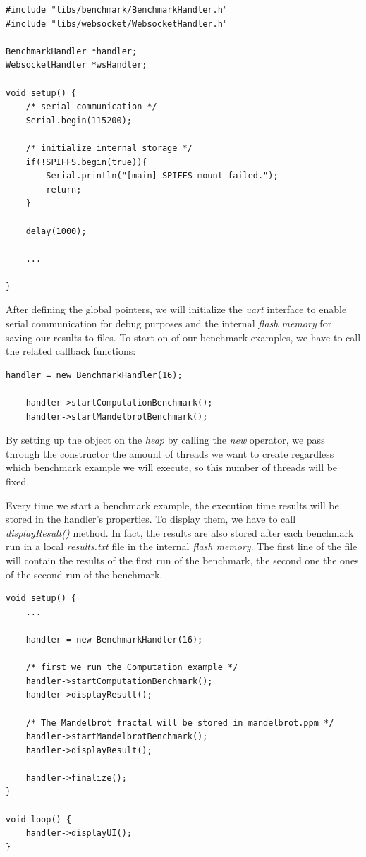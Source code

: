 \begin{lstlisting}[label=list:benchmarkHandler, caption=Necessary include's for the benchmark setup]
#include "libs/benchmark/BenchmarkHandler.h"
#include "libs/websocket/WebsocketHandler.h"

BenchmarkHandler *handler;
WebsocketHandler *wsHandler;

void setup() {
	/* serial communication */
	Serial.begin(115200);
	
	/* initialize internal storage */
	if(!SPIFFS.begin(true)){
		Serial.println("[main] SPIFFS mount failed.");
		return;
	}
	
	delay(1000);
	
	...
	
}
\end{lstlisting}

After defining the global pointers, we will initialize the \textit{uart} interface to enable serial communication for debug purposes and the internal \textit{flash memory} for saving our results to files. To start on of our benchmark examples, we have to call the related callback functions:

\begin{lstlisting}[label=list:benchmarkHandlerStart, caption=Example on how to start the benchmark process]
	handler = new BenchmarkHandler(16);

	handler->startComputationBenchmark();
	handler->startMandelbrotBenchmark();
\end{lstlisting}

\newpage

By setting up the object on the \textit{heap} by calling the \textit{new} operator, we pass through the constructor the amount of threads we want to create regardless which benchmark example we will execute, so this number of threads will be fixed.

Every time we start a benchmark example, the execution time results will be stored in the handler's properties. To display them, we have to call \textit{displayResult()} method. In fact, the results are also stored after each benchmark run in a local \textit{results.txt} file in the internal \textit{flash memory}. The first line of the file will contain the results of the first run of the benchmark, the second one the ones of the second run of the benchmark.

\begin{lstlisting}[label=list:benchmarkHandlerStart, caption=The final benchmark code.]
void setup() {
	...
	
	handler = new BenchmarkHandler(16);
	
	/* first we run the Computation example */	
	handler->startComputationBenchmark();
	handler->displayResult();
	
	/* The Mandelbrot fractal will be stored in mandelbrot.ppm */
	handler->startMandelbrotBenchmark();
	handler->displayResult();
	
	handler->finalize();
}
	
void loop() {
	handler->displayUI();
}
\end{lstlisting}

